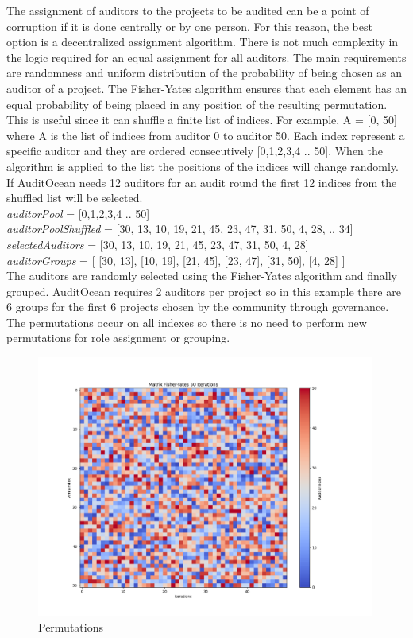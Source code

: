 \documentclass[9pt]{article}
\begin{document}
The assignment of auditors to the projects to be audited can be a point of corruption if it is done centrally or by one person. For this reason, the best option is a decentralized assignment algorithm. There is not much complexity in the logic required for an equal assignment for all auditors. The main requirements are randomness and uniform distribution of the probability of being chosen as an auditor of a project. The Fisher-Yates algorithm ensures that each element has an equal probability of being placed in any position of the resulting permutation. This is useful since it can shuffle a finite list of indices. For example, A = [0, 50] where A is the list of indices from auditor 0 to auditor 50. Each index represent a specific auditor and they are ordered consecutively [0,1,2,3,4 .. 50]. When the algorithm is applied to the list the positions of the indices will change randomly. If AuditOcean needs 12 auditors for an audit round the first 12 indices from the shuffled list will be selected.\\

\emph {auditorPool } = [0,1,2,3,4 .. 50] \\
\emph { auditorPoolShuffled } = [30, 13, 10, 19, 21, 45, 23, 47, 31, 50,  4, 28, .. 34]\\
\emph { selectedAuditors} = [30, 13, 10, 19, 21, 45, 23, 47, 31, 50,  4, 28]\\
\emph { auditorGroups } = [ [30, 13], [10, 19], [21, 45], [23, 47], [31, 50],  [4, 28] ]\\

The auditors are randomly selected using the Fisher-Yates algorithm and finally grouped. AuditOcean requires 2 auditors per project so in this example there are 6 groups for the first 6 projects chosen by the community through governance. The permutations occur on all indexes so there is no need to perform new permutations for role assignment or grouping.
\begin{figure}[H]
  \centering
  \includegraphics[width=0.99\textwidth]{matrix.png}
  \caption{Permutations
  }
  \label{fig:matrix}
\end{figure}
\end{document}

